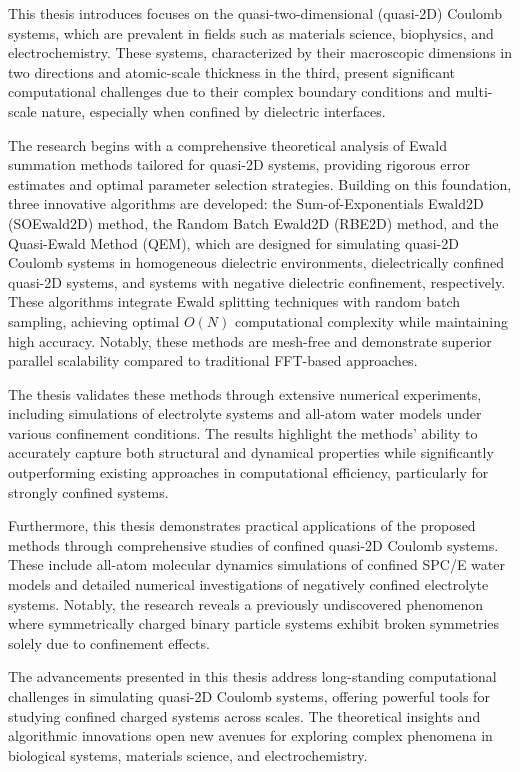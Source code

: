 This thesis introduces focuses on the quasi-two-dimensional (quasi-2D) Coulomb systems, which are prevalent in fields such as materials science, biophysics, and electrochemistry. 
These systems, characterized by their macroscopic dimensions in two directions and atomic-scale thickness in the third, present significant computational challenges due to their complex boundary conditions and multi-scale nature, especially when confined by dielectric interfaces.

The research begins with a comprehensive theoretical analysis of Ewald summation methods tailored for quasi-2D systems, providing rigorous error estimates and optimal parameter selection strategies. 
Building on this foundation, three innovative algorithms are developed: the Sum-of-Exponentials Ewald2D (SOEwald2D) method, the Random Batch Ewald2D (RBE2D) method, and the Quasi-Ewald Method (QEM), which are designed for simulating quasi-2D Coulomb systems in homogeneous dielectric environments, dielectrically confined quasi-2D systems, and systems with negative dielectric confinement, respectively.
These algorithms integrate Ewald splitting techniques with random batch sampling, achieving optimal $O(N)$ computational complexity while maintaining high accuracy. 
Notably, these methods are mesh-free and demonstrate superior parallel scalability compared to traditional FFT-based approaches.

The thesis validates these methods through extensive numerical experiments, including simulations of electrolyte systems and all-atom water models under various confinement conditions. 
The results highlight the methods' ability to accurately capture both structural and dynamical properties while significantly outperforming existing approaches in computational efficiency, particularly for strongly confined systems.

Furthermore, this thesis demonstrates practical applications of the proposed methods through comprehensive studies of confined quasi-2D Coulomb systems. 
These include all-atom molecular dynamics simulations of confined SPC/E water models and detailed numerical investigations of negatively confined electrolyte systems. 
Notably, the research reveals a previously undiscovered phenomenon where symmetrically charged binary particle systems exhibit broken symmetries solely due to confinement effects.

The advancements presented in this thesis address long-standing computational challenges in simulating quasi-2D Coulomb systems, offering powerful tools for studying confined charged systems across scales. 
The theoretical insights and algorithmic innovations open new avenues for exploring complex phenomena in biological systems, materials science, and electrochemistry.